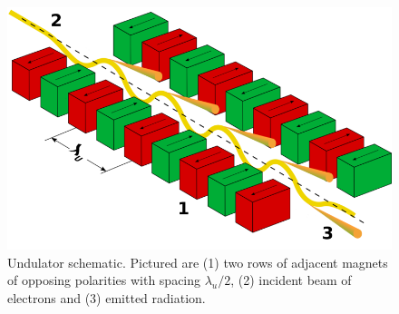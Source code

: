 \documentclass[aps,prb,twocolumn,superscriptaddress]{revtex4-2}
\begin{document}
\begin{figure}[h]
    \centering
    \includegraphics[width=0.9\linewidth]{Figures/800px-Undulator.png}
    \caption{Undulator schematic. Pictured are (1) two rows of adjacent magnets 
        of opposing polarities with spacing $\lambda_u/2$, (2) incident beam of
        electrons and (3) emitted radiation.}
    \label{fig:Undulator}
\end{figure}

\end{document}
